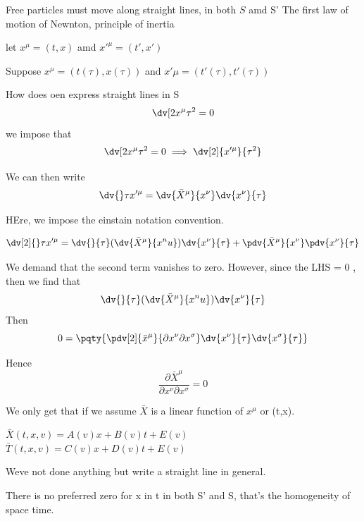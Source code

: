 Free particles must move along straight lines, in both $S$ amd S'
The first law of motion of Newnton, principle of inertia

let $x^\mu = (t,x)$ amd $x'^\mu = (t',x')$  

Suppose $x^\mu = (t(\tau), x(\tau))$ and $x'\mu = (t'(\tau),t'(\tau))$

How does oen express straight lines in S
\begin{equation}
	\dv[2{x^\mu}{}\tau^2 = 0
\end{equation}
we impose that 
\begin{equation}
	\dv[2{x^\mu}{}\tau^2 = 0 \implies \dv[2]{x'^\mu}{\tau^2} 
\end{equation}


We can then write
\begin{equation}
    \dv{}\tau{}x'^\mu = \dv{\bar X^\mu}{x^\nu} \dv{x^\nu}{\tau}   
\end{equation}

HEre, we impose the einstain notation convention. 

\begin{equation}
	\dv[2]{}\tau{}x'^\mu = \dv{}{\tau}( \dv{\bar X^\mu}{x^nu} ) \dv{x^\nu}{\tau} + \pdv{\bar X^\mu}{x^\nu} \pdv{x^\nu}{\tau}   
\end{equation}

We demand that the second term vanishes to zero. However, since the LHS = 0 , then we find that 
\begin{equation}
\dv{}{\tau}( \dv{\bar X^\mu}{x^nu} ) \dv{x^\nu}{\tau}
\end{equation}
Then
\begin{equation}
	0 = \pqty{
		\pdv[2]{\bar x^\mu}{\partial x^\nu \partial x^\sigma} \dv{x^\nu}{\tau} \dv{x^\sigma}{\tau}   
	}
\end{equation}

Hence
\begin{equation}
    \frac{\partial \bar X^\mu}{\partial x^\nu \partial x^\sigma} = 0 
\end{equation}

We only get that if we assume $\bar X$ is a linear function of $x^\mu $ or (t,x).

$\bar X (t,x,v) = A(v)x+ B(v)t+ E(v)$ 
$\bar T (t,x,v) = C(v)x+ D(v)t+ E(v)$ 

Weve not done anything but write a straight line in general.

There is no preferred zero for x in t in both S' and S, that's the homogeneity of space time.

